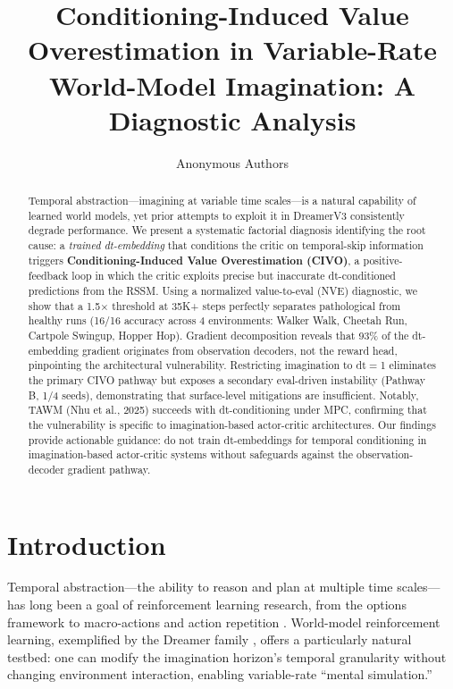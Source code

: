 \documentclass[10pt,letterpaper]{article}
\title{Conditioning-Induced Value Overestimation in Variable-Rate\\World-Model Imagination: A Diagnostic Analysis}
\author{
Anonymous Authors
}
\date{}
\begin{document}
\maketitle

\begin{abstract}
Temporal abstraction---imagining at variable time scales---is a natural capability of learned world models, yet prior attempts to exploit it in DreamerV3 consistently degrade performance.
We present a systematic factorial diagnosis identifying the root cause: a \emph{trained dt-embedding} that conditions the critic on temporal-skip information triggers \textbf{Conditioning-Induced Value Overestimation (CIVO)}, a positive-feedback loop in which the critic exploits precise but inaccurate dt-conditioned predictions from the RSSM.
Using a normalized value-to-eval (NVE) diagnostic, we show that a 1.5$\times$ threshold at 35K+ steps perfectly separates pathological from healthy runs (16/16 accuracy across 4 environments: Walker Walk, Cheetah Run, Cartpole Swingup, Hopper Hop).
Gradient decomposition reveals that 93\% of the dt-embedding gradient originates from observation decoders, not the reward head, pinpointing the architectural vulnerability.
Restricting imagination to dt$=$1 eliminates the primary CIVO pathway but exposes a secondary eval-driven instability (Pathway B, 1/4 seeds), demonstrating that surface-level mitigations are insufficient.
Notably, TAWM (Nhu et al., 2025) succeeds with dt-conditioning under MPC, confirming that the vulnerability is specific to imagination-based actor-critic architectures.
Our findings provide actionable guidance: do not train dt-embeddings for temporal conditioning in imagination-based actor-critic systems without safeguards against the observation-decoder gradient pathway.
\end{abstract}

\section{Introduction}

Temporal abstraction---the ability to reason and plan at multiple time scales---has long been a goal of reinforcement learning research, from the options framework \citep{sutton1999options} to macro-actions and action repetition \citep{lakshminarayanan2017dynamic}.
World-model reinforcement learning, exemplified by the Dreamer family \citep{hafner2020dreamer,hafner2023dreamerv3}, offers a particularly natural testbed: one can modify the imagination horizon's temporal granularity without changing environment interaction, enabling variable-rate ``mental simulation.''
\end{document}
